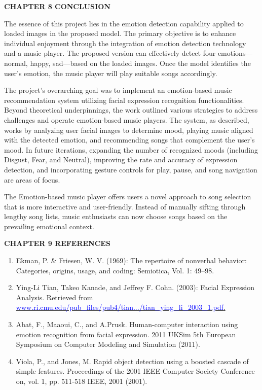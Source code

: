 \documentclass[a4paper]{article}
\newcommand\liststyleWWNumi{%
\renewcommand\theenumi{\arabic{enumi}}
\renewcommand\theenumii{\alph{enumii}}
\renewcommand\theenumiii{\roman{enumiii}}
\renewcommand\theenumiv{\arabic{enumiv}}
\renewcommand\labelenumi{[\theenumi]}
\renewcommand\labelenumii{\theenumii}
\renewcommand\labelenumiii{\theenumiii}
\renewcommand\labelenumiv{\theenumiv}
}
\begin{document}
\bigskip

\clearpage\setcounter{page}{1}\pagestyle{Convertedxiii}
{\bfseries
\hypertarget{147n2zr}{}CHAPTER 8 CONCLUSION}

The essence of this project lies in the emotion detection capability applied to loaded images in the proposed model. The
primary objective is to enhance individual enjoyment through the integration of emotion detection technology and a
music player. The proposed version can effectively detect four emotions---normal, happy, sad---based on the loaded
images. Once the model identifies the user's emotion, the music player will play suitable songs accordingly.

The project's overarching goal was to implement an emotion-based music recommendation system utilizing facial expression
recognition functionalities. Beyond theoretical underpinnings, the work outlined various strategies to address
challenges and operate emotion-based music players. The system, as described, works by analyzing user facial images to
determine mood, playing music aligned with the detected emotion, and recommending songs that complement the user's
mood. In future iterations, expanding the number of recognized moods (including Disgust, Fear, and Neutral), improving
the rate and accuracy of expression detection, and incorporating gesture controls for play, pause, and song navigation
are areas of focus.

The Emotion-based music player offers users a novel approach to song selection that is more interactive and
user-friendly. Instead of manually sifting through lengthy song lists, music enthusiasts can now choose songs based on
the prevailing emotional context. 

\clearpage\setcounter{page}{1}\pagestyle{Convertedxiv}
{\bfseries
\hypertarget{3o7alnk}{}CHAPTER 9 REFERENCES}

\liststyleWWNumi
\begin{enumerate}
\item Ekman, P. \& Friesen, W. V. (1969): The repertoire of nonverbal behavior: Categories, origins, usage, and coding:
Semiotica, Vol. 1: 49--98. \ 
\item Ying-Li Tian, Takeo Kanade, and Jeffrey F. Cohn. (2003): Facial Expression Analysis. Retrieved from
\href{http://www.ri.cmu.edu/pub_files/pub4/tian.../tian_ying_li_2003_1.pdf}{\textcolor{blue}{www.ri.cmu.edu/pub\_files/pub4/tian.../tian\_ying\_li\_2003\_1.pdf}}\href{http://www.ri.cmu.edu/pub_files/pub4/tian.../tian_ying_li_2003_1.pdf}{.}

\item Abat, F., Maaoui, C., and A.Prusk. Human-computer interaction using emotion recognition from facial expression.
2011 UKSim 5th European Symposium on Computer Modeling and Simulation (2011). 
\item Viola, P., and Jones, M. Rapid object detection using a boosted cascade of simple features. Proceedings of the
2001 IEEE Computer Society Conference on, vol. 1, pp. 511-518 IEEE, 2001 (2001). 
\end{enumerate}
\end{document}
